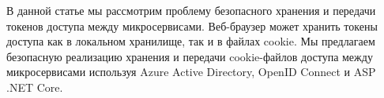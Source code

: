 В данной статье мы рассмотрим проблему безопасного хранения и передачи токенов доступа между микросервисами.
Веб-браузер может хранить токены доступа как в локальном хранилище, так и в файлах cookie.
Мы предлагаем безопасную реализацию хранения и передачи cookie-файлов доступа между микросервисами используя Azure Active Directory, OpenID Connect и ASP .NET Core.